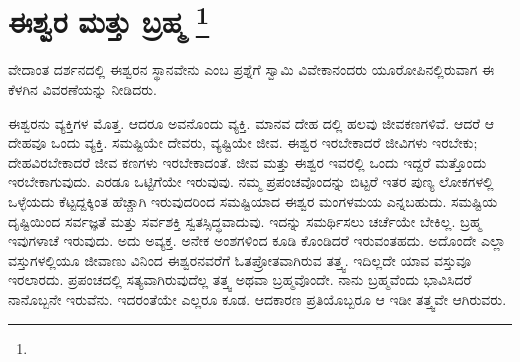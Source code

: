 
\chapter[ಈಶ್ವರ ಮತ್ತು ಬ್ರಹ್ಮ ]{ಈಶ್ವರ ಮತ್ತು ಬ್ರಹ್ಮ \protect\footnote{}}

ವೇದಾಂತ ದರ್ಶನದಲ್ಲಿ ಈಶ್ವರನ ಸ್ಥಾನವೇನು ಎಂಬ ಪ್ರಶ್ನೆಗೆ ಸ್ವಾಮಿ ವಿವೇಕಾನಂದರು ಯೂರೋಪಿನಲ್ಲಿರುವಾಗ ಈ ಕೆಳಗಿನ ವಿವರಣೆಯನ್ನು ನೀಡಿದರು.

ಈಶ್ವರನು ವ್ಯಕ್ತಿಗಳ ಮೊತ್ತ. ಆದರೂ ಅವನೊಂದು ವ್ಯಕ್ತಿ. ಮಾನವ ದೇಹ ದಲ್ಲಿ ಹಲವು ಜೀವಕಣಗಳಿವೆ. ಆದರೆ ಆ ದೇಹವೂ ಒಂದು ವ್ಯಕ್ತಿ. ಸಮಷ್ಟಿಯೇ ದೇವರು, ವ್ಯಷ್ಟಿಯೇ ಜೀವ. ಈಶ್ವರ ಇರಬೇಕಾದರೆ ಜೀವಿಗಳು ಇರಬೇಕು; ದೇಹವಿರಬೇಕಾದರೆ ಜೀವ ಕಣಗಳು  ಇರಬೇಕಾದಂತೆ. ಜೀವ ಮತ್ತು ಈಶ್ವರ ಇವರಲ್ಲಿ ಒಂದು ಇದ್ದರೆ ಮತ್ತೊಂದು ಇರಬೇಕಾಗುವುದು. ಎರಡೂ ಒಟ್ಟಿಗೆಯೇ ಇರುವುವು. ನಮ್ಮ ಪ್ರಪಂಚವೊಂದನ್ನು ಬಿಟ್ಟರೆ ಇತರ ಪುಣ್ಯ ಲೋಕಗಳಲ್ಲಿ ಒಳ್ಳೆಯದು ಕೆಟ್ಟದ್ದಕ್ಕಿಂತ ಹೆಚ್ಚಾಗಿ ಇರುವುದರಿಂದ ಸಮಷ್ಟಿಯಾದ ಈಶ್ವರ ಮಂಗಳಮಯ ಎನ್ನಬಹುದು. ಸಮಷ್ಟಿಯ ದೃಷ್ಟಿಯಿಂದ ಸರ್ವಜ್ಞತೆ ಮತ್ತು ಸರ್ವಶಕ್ತಿ ಸ್ವತಸ್ಸಿದ್ಧವಾದುವು. ಇದನ್ನು ಸಮರ್ಥಿಸಲು ಚರ್ಚೆಯೇ ಬೇಕಿಲ್ಲ. ಬ್ರಹ್ಮ ಇವುಗಳಾಚೆ ಇರುವುದು. ಅದು ಅವ್ಯಕ್ತ. ಅನೇಕ ಅಂಶಗಳಿಂದ ಕೂಡಿ ಕೊಂಡಿದರೆ ಇರುವಂತಹದು. ಅದೊಂದೇ ಎಲ್ಲಾ ವಸ್ತುಗಳಲ್ಲಿಯೂ ಜೀವಾಣು ವಿನಿಂದ ಈಶ್ವರನವರೆಗೆ ಓತಪ್ರೋತವಾಗಿರುವ ತತ್ತ್ವ. ಇದಿಲ್ಲದೇ ಯಾವ ವಸ್ತುವೂ ಇರಲಾರದು. ಪ್ರಪಂಚದಲ್ಲಿ ಸತ್ಯವಾಗಿರುವುದೆಲ್ಲ ತತ್ತ್ವ ಅಥವಾ ಬ್ರಹ್ಮವೊಂದೇ. ನಾನು ಬ್ರಹ್ಮವೆಂದು ಭಾವಿಸಿದರೆ ನಾನೊಬ್ಬನೇ ಇರುವೆನು. ಇದರಂತೆಯೇ ಎಲ್ಲರೂ ಕೂಡ. ಆದಕಾರಣ ಪ್ರತಿಯೊಬ್ಬರೂ ಆ ಇಡೀ ತತ್ತ್ವವೇ ಆಗಿರುವರು.


